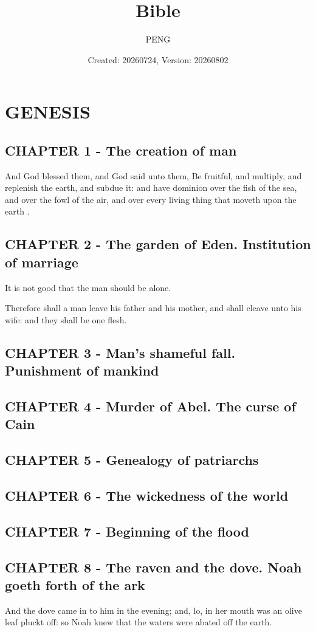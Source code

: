\documentclass{article}
\title{Bible}
\author{PENG}
\date{Created: 20260724, Version: 20260802}
\begin{document}
\maketitle
\tableofcontents
\section{GENESIS}
\subsection{CHAPTER 1 - The creation of man}
And God blessed them, and God said unto them, Be fruitful, and multiply, and replenish the earth, and subdue it: and have dominion over the fish of the sea, and over the fowl of the air, and over every living thing that moveth upon the earth \cite{CARROLL_2008_THE_BIBLE_AUTHORIZED_KING_JAMES_VERSION}.

\subsection{CHAPTER 2 - The garden of Eden. Institution of marriage}
It is not good that the man should be alone.

Therefore shall a man leave his father and his mother, and shall cleave unto his wife: and they shall be one flesh.

\subsection{CHAPTER 3 - Man's shameful fall. Punishment of mankind}
\subsection{CHAPTER 4 - Murder of Abel. The curse of Cain}
\subsection{CHAPTER 5 - Genealogy of patriarchs}
\subsection{CHAPTER 6 - The wickedness of the world}
\subsection{CHAPTER 7 - Beginning of the flood}
\subsection{CHAPTER 8 - The raven and the dove. Noah goeth forth of the ark}
And the dove came in to him in the evening; and, lo, in her mouth was an olive leaf pluckt off: so Noah knew that the waters were abated off the earth.
\end{document}
